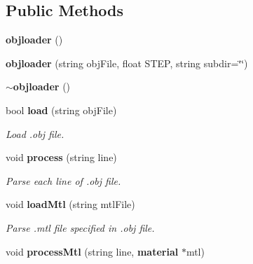 \subsection*{Public Methods}
\begin{CompactItemize}
\item 
{}
{\bf objloader} ()\label{classobjloader_a0}

\item 
{}
{\bf objloader} (string obj\-File, float STEP, string subdir=\char`\"{}\char`\"{})\label{classobjloader_a1}

\item 
{}
{\bf $\sim$objloader} ()\label{classobjloader_a2}

\item 
{}
bool {\bf load} (string obj\-File)\label{classobjloader_a3}

\begin{CompactList}\small\item\em Load .obj file.\item\end{CompactList}\item 
{}
void {\bf process} (string line)\label{classobjloader_a4}

\begin{CompactList}\small\item\em Parse each line of .obj file.\item\end{CompactList}\item 
{}
void {\bf load\-Mtl} (string mtl\-File)\label{classobjloader_a5}

\begin{CompactList}\small\item\em Parse .mtl file specified in .obj file.\item\end{CompactList}\item 
{}
void {\bf process\-Mtl} (string line, {\bf material} $\ast$mtl)\label{classobjloader_a6}


\end{CompactItemize}

